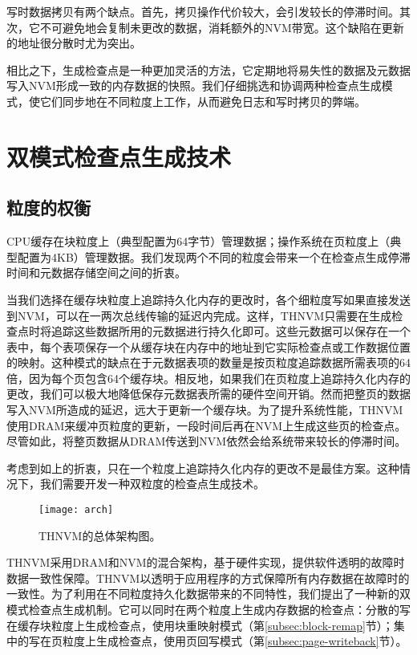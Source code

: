 写时数据拷贝有两个缺点。首先，拷贝操作代价较大，会引发较长的停滞时间。其次，它不可避免地会复制未更改的数据，消耗额外的NVM带宽。这个缺陷在更新的地址很分散时尤为突出。

相比之下，生成检查点是一种更加灵活的方法，它定期地将易失性的数据及元数据写入NVM形成一致的内存数据的快照。我们仔细挑选和协调两种检查点生成模式，使它们同步地在不同粒度上工作，从而避免日志和写时拷贝的弊端。


\section{双模式检查点生成技术}

\subsection{粒度的权衡}

CPU缓存在块粒度上（典型配置为64字节）管理数据；操作系统在页粒度上（典型配置为4KB）管理数据。我们发现两个不同的粒度会带来一个在检查点生成停滞时间和元数据存储空间之间的折衷。

当我们选择在缓存块粒度上追踪持久化内存的更改时，各个细粒度写如果直接发送到NVM，可以在一两次总线传输的延迟内完成。这样，THNVM只需要在生成检查点时将追踪这些数据所用的元数据进行持久化即可。这些元数据可以保存在一个表中，每个表项保存一个从缓存块在内存中的地址到它实际检查点或工作数据位置的映射。这种模式的缺点在于元数据表项的数量是按页粒度追踪数据所需表项的64倍，因为每个页包含64个缓存块。相反地，如果我们在页粒度上追踪持久化内存的更改，我们可以极大地降低保存元数据表所需的硬件空间开销。然而把整页的数据写入NVM所造成的延迟，远大于更新一个缓存块。为了提升系统性能，THNVM使用DRAM来缓冲页粒度的更新，一段时间后再在NVM上生成这些页的检查点。尽管如此，将整页数据从DRAM传送到NVM依然会给系统带来较长的停滞时间。

考虑到如上的折衷，只在一个粒度上追踪持久化内存的更改不是最佳方案。这种情况下，我们需要开发一种双粒度的检查点生成技术。

\begin{figure}[!ht]
\centering
\texttt{[image: arch]}
\caption{THNVM的总体架构图。}
\label{fig-arch}
\end{figure}

THNVM采用DRAM和NVM的混合架构，基于硬件实现，提供软件透明的故障时数据一致性保障。THNVM以透明于应用程序的方式保障所有内存数据在故障时的一致性。为了利用在不同粒度持久化数据带来的不同特性，我们提出了一种新的双模式检查点生成机制。它可以同时在两个粒度上生成内存数据的检查点：分散的写在缓存块粒度上生成检查点，使用块重映射模式（第\ref{subsec:block-remap}节）；集中的写在页粒度上生成检查点，使用页回写模式（第\ref{subsec:page-writeback}节）。

